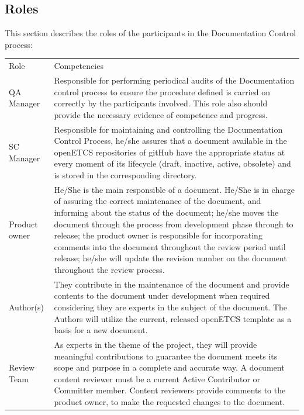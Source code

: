 \documentclass{template/openetcs_article}
\begin{document}
\subsection{Roles}

This section describes the roles of the participants in the Documentation Control process:

\begin{table}[H]
\begin{tabular}{|m{3cm}|m{11cm}|}
\hline
\rowcolor{myblue}
\multicolumn{2}{|c|}{Roles} \\\hline
\rowcolor{lightgray}
Role &
Competencies 
\\\hline
QA Manager & 
Responsible for performing periodical audits of the Documentation control process to ensure the procedure defined is carried on correctly by the participants involved. This role also should provide the necessary evidence of competence and
progress. 
\\\hline
SC Manager & 
Responsible for maintaining and controlling the Documentation Control Process, he/she assures that a document available in the openETCS repositories of gitHub have the appropriate status at every moment of its lifecycle (draft, inactive, active, obsolete) and is stored in the corresponding directory.
\\\hline
Product owner &
He/She is the main responsible of a document. 
He/She is in charge of assuring the correct maintenance of the document, and informing about the status of the document; he/she moves the document through the process from development phase through to release; the product owner is responsible for incorporating comments into the document throughout the review period until release; he/she will update the revision number on the document throughout the review process.
\\\hline
Author(s) & 
They contribute in the maintenance of the document and provide contents to the document under development when required considering they are experts in the subject of the document. The Authors will utilize the current, released openETCS template as a basis for a new document.
\\\hline
Review Team &
As experts in the theme of the project, they will provide meaningful contributions to guarantee the document meets its scope and purpose in a complete and accurate way. A document content reviewer must be a current Active Contributor or Committer member. Content reviewers provide comments to the product owner, to make the requested changes to the document.
\\\hline

\end{tabular}
\end{table}
\end{document}
